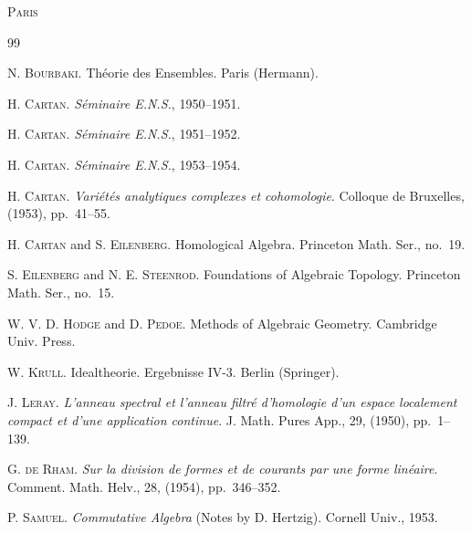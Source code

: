 
\medskip
\noindent\textsc{Paris}

\renewcommand{\refname}{Bibliography}
\label{fac:bibliography}
\begin{thebibliography}{99}

\label{fac:bib:1}
N. \textsc{Bourbaki}. Théorie des Ensembles. Paris (Hermann).

\label{fac:bib:2}
H. \textsc{Cartan}. \textit{Séminaire E.N.S.}, 1950--1951.

\label{fac:bib:3}
H. \textsc{Cartan}. \textit{Séminaire E.N.S.}, 1951--1952.

\label{fac:bib:4}
H. \textsc{Cartan}. \textit{Séminaire E.N.S.}, 1953--1954.

\label{fac:bib:5}
H. \textsc{Cartan}. \textit{Variétés analytiques complexes et
cohomologie}. Colloque de Bruxelles, (1953), pp.~41--55.

\label{fac:bib:6}
H. \textsc{Cartan} and S. \textsc{Eilenberg}. Homological Algebra.
Princeton Math. Ser., no.~19.

\label{fac:bib:7}
S. \textsc{Eilenberg} and N. E. \textsc{Steenrod}. Foundations of
Algebraic Topology. Princeton Math. Ser., no.~15.

\label{fac:bib:8}
W. V. D. \textsc{Hodge} and D. \textsc{Pedoe}. Methods of Algebraic
Geometry. Cambridge Univ. Press.

\label{fac:bib:9}
W. \textsc{Krull}. Idealtheorie. Ergebnisse IV-3. Berlin (Springer).

\label{fac:bib:10}
J. \textsc{Leray}. \textit{L'anneau spectral et l'anneau filtré
d'homologie d'un espace localement compact et d'une application
continue}. J. Math. Pures App., 29, (1950), pp.~1--139.

\label{fac:bib:11}
G. \textsc{de Rham}. \textit{Sur la division de formes et de courants
par une forme linéaire}. Comment. Math. Helv., 28, (1954), pp.~346--352.

\label{fac:bib:12}
P. \textsc{Samuel}. \textit{Commutative Algebra} (Notes by D. Hertzig).
Cornell Univ., 1953.


\end{thebibliography}
